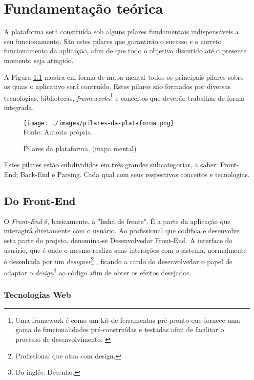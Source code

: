 \chapter{Fundamentação teórica}

A plataforma será construída sob alguns pilares fundamentais indispensáveis
a seu funcionamento. São estes pilares que garantirão o sucesso e o correto
funcionamento da aplicação, afim de que todo o objetivo discutido até o
presente momento seja atingido.

A
Figura \ref{fig:pilares-da-plataforma}
mostra em forma de mapa mental todos os principais pilares sobre os quais
o aplicativo será contruído. Estes pilares são formados por diversas
tecnologias, bibliotecas,
\textit{frameworks}\footnote{Uma framework é como um kit de ferramentas pré-pronto que fornece uma gama
    de funcionalidades pré-construídas e testadas afim de facilitar o processo
    de desenvolvimento. \cite{amazon-framework}
}
e conceitos que deverão trabalhar de forma integrada.

\begin{figure}[H]
    \centering
    \caption{Pilares da plataforma, (mapa mental)}
    \texttt{[image: ./images/pilares-da-plataforma.png]}
    \label{fig:pilares-da-plataforma} \\
    \textnormal{\fontsize{10pt}{12pt}Fonte: Autoria própria.}
\end{figure}

Estes pilares estão subdivididos em três grandes subcategorias, a saber: Front-End;
Back-End e Parsing. Cada qual com seus respectivos conceitos e tecnologias.

\section{Do Front-End}

O
\textit{Front-End}
é, basicamente, a "linha de frente". É a parte da aplicação que interagirá
diretamente com o usuário. Ao profissional que codifica e desenvolve esta parte do
projeto, denomina-se Desenvolvedor Front-End. A interface do usuário, que é
onde o mesmo realiza suas interações com o sistema, normalmente é desenhada por
um
\textit{designer}\footnote{Profissional que atua com design.
}
, ficando a cardo do desenvolvedor o papel de adaptar o
\textit{design}\footnote{Do inglês: Desenho.
}
ao código afim de obter os efeitos desejados.
\cite{totvs-front-end}

\subsection{Tecnologias Web}

